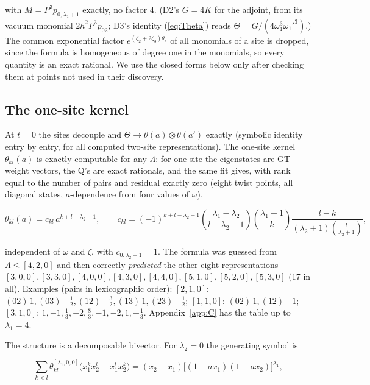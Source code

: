 \documentclass[11pt]{article}
\begin{document}
with $M=P^3p_{0,\lambda_2+1}$ exactly, no factor $4$. (D2's $G=4K$ for the adjoint, from its vacuum monomial $2h^2P^3p_{02}$; D3's identity (\ref{eq:Theta}) reads $\Theta=G/(4\omega_1^3\omega_1'^3)$.) The common exponential factor $e^{(\zeta_2+2\zeta_3)\theta_s}$ of all monomials of a site is dropped, since the formula is homogeneous of degree one in the monomials, so every quantity is an exact rational.
We use the closed forms below only after checking them at points not used in their discovery.

\subsection{The one-site kernel}\label{sec:onesite}

At $t=0$ the sites decouple and $\Theta\to\theta(a)\otimes\theta(a')$ exactly (symbolic identity entry by entry, for all computed two-site representations).
The one-site kernel $\theta_{kl}(a)$ is exactly computable for any $\Lambda$: for one site the eigenstates are GT weight vectors, the Q's are exact rationals, and the same fit gives, with rank equal to the number of pairs and residual exactly zero (eight twist points, all diagonal states, $a$-dependence from four values of $\omega$),

\begin{equation}
\theta_{kl}(a)=c_{kl}\,a^{k+l-\lambda_2-1},\qquad c_{kl}=(-1)^{k+l-\lambda_2-1}\binom{\lambda_1-\lambda_2}{l-\lambda_2-1}\binom{\lambda_1+1}{k}\frac{l-k}{(\lambda_2+1)\binom{l}{\lambda_2+1}},\label{eq:ckl}
\end{equation}

independent of $\omega$ and $\zeta$, with $c_{0,\lambda_2+1}=1$. The formula was guessed from $\Lambda\le[4,2,0]$ and then correctly \emph{predicted} the other eight representations $[3,0,0],[3,3,0],[4,0,0],[4,3,0],[4,4,0],[5,1,0],[5,2,0],[5,3,0]$ (17 in all).
Examples (pairs in lexicographic order): $[2,1,0]$: $(02)\,1,(03)\,{-\tfrac12},(12)\,{-\tfrac32},(13)\,1,(23)\,{-\tfrac12}$; $[1,1,0]$: $(02)\,1,(12)\,{-1}$; $[3,1,0]$: $1,-1,\tfrac13,-2,\tfrac83,-1,-2,1,-\tfrac13$. Appendix~\ref{app:C} has the table up to $\lambda_1=4$.

The structure is a decomposable bivector.
For $\lambda_2=0$ the generating symbol is

\begin{equation}
\sum_{k<l}\theta^{[\lambda_1,0,0]}_{kl}\bigl(x_1^kx_2^l-x_1^lx_2^k\bigr)=(x_2-x_1)\bigl[(1-ax_1)(1-ax_2)\bigr]^{\lambda_1},\label{eq:symbol}
\end{equation}
\end{document}
